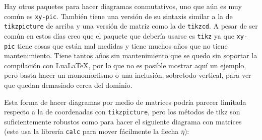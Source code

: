 Hay otros paquetes para hacer diagramas conmutativos, uno que aún es muy
común es \texttt{xy-pic}. También tiene una versión de su sintaxis similar
a la de \texttt{tikzpicture} de arriba y una versión de matriz como la de
\texttt{tikzcd}. A pesar de ser común en estos días creo que el paquete que
debería usarse es \texttt{tikz} ya que \texttt{xy-pic} tiene cosas que
están mal medidas y tiene muchos años que no tiene mantenimiento. Tiene
tantos años sin mantenimiento que se quedo sin soportar la compilación con
Lua\LaTeX, por lo que no es posible mostrar aquí un ejemplo, pero basta
hacer un monomorfismo o una inclusión, sobretodo vertical, para ver que
quedan demasiado cerca del dominio.

Esta forma de hacer diagramas por medio de matrices podría parecer limitada
respecto a la de coordenadas con \texttt{tikzpicture}, pero los métodos de
tikz son suficientemente robustos como para hacer el siguiente diagrama con
matrices (este usa la librería \texttt{calc} para mover fácilmente la flecha
\(\bar{\eta}\)):
\begin{center}
\end{center}


